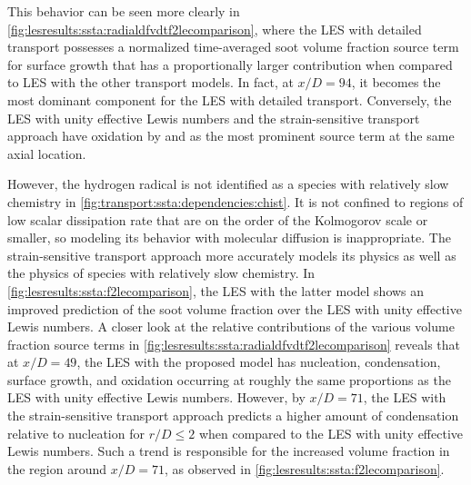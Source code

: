 This behavior can be seen more clearly in \cref{fig:lesresults:ssta:radialdfvdtf2lecomparison}, where the LES with detailed transport possesses a normalized time-averaged soot volume fraction source term for surface growth that has a proportionally larger contribution when compared to LES with the other transport models. In fact, at $x/D = 94$, it becomes the most dominant component for the LES with detailed transport. Conversely, the LES with unity effective Lewis numbers and the strain-sensitive transport approach have oxidation by  and  as the most prominent source term at the same axial location.

However, the hydrogen radical is not identified as a species with relatively slow chemistry in \cref{fig:transport:ssta:dependencies:chist}. It is not confined to regions of low scalar dissipation rate that are on the order of the Kolmogorov scale or smaller, so modeling its behavior with molecular diffusion is inappropriate. The strain-sensitive transport approach more accurately models its physics as well as the physics of species with relatively slow chemistry. In \cref{fig:lesresults:ssta:f2lecomparison}, the LES with the latter model shows an improved prediction of the soot volume fraction over the LES with unity effective Lewis numbers. A closer look at the relative contributions of the various volume fraction source terms in \cref{fig:lesresults:ssta:radialdfvdtf2lecomparison} reveals that at $x/D = 49$, the LES with the proposed model has nucleation, condensation, surface growth, and oxidation occurring at roughly the same proportions as the LES with unity effective Lewis numbers. However, by $x/D = 71$, the LES with the strain-sensitive transport approach predicts a higher amount of condensation relative to nucleation for $r/D \le 2$ when compared to the LES with unity effective Lewis numbers. Such a trend is responsible for the increased volume fraction in the region around $x/D = 71$, as observed in \cref{fig:lesresults:ssta:f2lecomparison}.

